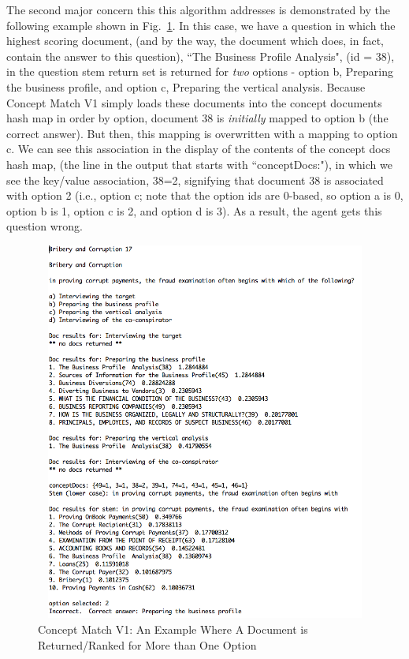 The second major concern this this algorithm addresses is demonstrated by the following example shown in Fig.~\ref{fig:concept_match_v1_wrong_option_doc}.  In this case, we have a question in which the highest scoring document, (and by the way, the document which does, in fact, contain the answer to this question), ``The Business Profile Analysis", (id = 38), in the question stem return set is returned for \emph{two} options - option b, Preparing the business profile, and option c,  Preparing the vertical analysis.  Because Concept Match V1 simply loads these documents into the concept documents hash map in order by option, document 38 is \emph{initially} mapped to option b (the correct answer).  But then, this mapping is overwritten with a mapping to option c.  We can see this association in the display of the contents of the concept docs hash map, (the line in the output that starts with ``conceptDocs:"), in which we see the key/value association, 38=2, signifying that document 38 is associated with option 2 (i.e., option c; note that the option ids are 0-based, so option a is 0, option b is 1, option c is 2, and option d is 3).  As a result, the agent gets this question wrong.

\begin{figure}
\centering
\vspace{1.0in}
\includegraphics[width=125mm, height=125mm]{concept_match_v1_wrong_option_doc.png}
\caption{Concept Match V1: An Example Where A Document is Returned/Ranked for More than One Option}
\label{fig:concept_match_v1_wrong_option_doc}
\end{figure}

